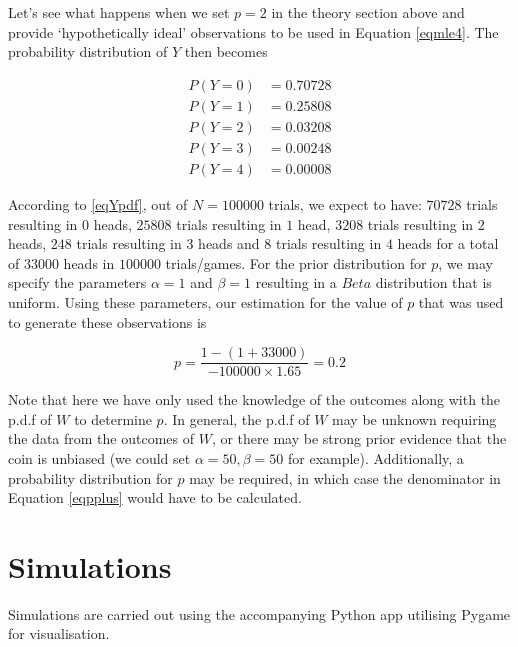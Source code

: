 \documentclass{article}
\begin{document}
\begin{flushleft}
Let's see what happens when we set $p=2$ in the theory section above and provide `hypothetically ideal' observations to be used in Equation \ref{eqmle4}. The probability distribution of $Y$ then becomes

\begin{equation} \label{eqYpdf}
\begin{split}
P(Y=0) &= 0.70728 \\
P(Y=1) &= 0.25808 \\
P(Y=2) &= 0.03208 \\
P(Y=3) &= 0.00248 \\
P(Y=4) &= 0.00008
\end{split}
\end{equation}

According to \ref{eqYpdf}, out of $N=100000$ trials, we expect to have: $70728$ trials resulting in $0$ heads, $25808$ trials resulting in $1$ head, $3208$ trials resulting in $2$ heads, $248$ trials resulting in $3$ heads and $8$ trials resulting in $4$ heads for a total of $33000$ heads in $100000$ trials/games. For the prior distribution for $p$, we may specify the parameters $\alpha=1$ and $\beta=1$ resulting in a $Beta$ distribution that is uniform. Using these parameters, our estimation for the value of $p$ that was used to generate these observations is

$$p = \frac{1-(1+33000)}{-100000 \times 1.65} = 0.2$$

Note that here we have only used the knowledge of the outcomes along with the p.d.f of $W$ to determine $p$. In general, the p.d.f of $W$ may be unknown requiring the data from the outcomes of $W$, or there may be strong prior evidence that the coin is unbiased (we could set $\alpha = 50,\beta = 50$ for example). Additionally, a probability distribution for $p$ may be required, in which case the denominator in Equation \ref{eqpplus} would have to be calculated.

\end{flushleft}
\section{Simulations} %

Simulations are carried out using the accompanying Python app utilising Pygame for visualisation. 
\end{document}
